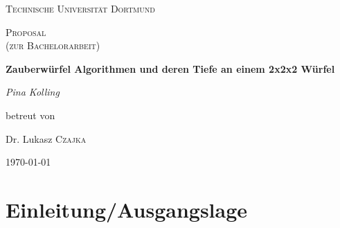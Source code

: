 \documentclass[12pt,a4paper, usenames, dvipsnames]{scrartcl}
\begin{document}
\begin{titlepage}
	\centering
	\vspace*{4cm}
	{\scshape\LARGE Technische Universität Dortmund \par}
	\vspace{1cm}
	{\scshape\Large Proposal \\
	(zur Bachelorarbeit) \par}
	\vspace{1.5cm}
	{\huge\bfseries Zauberwürfel Algorithmen und deren Tiefe an einem 2x2x2 Würfel\par}
	\vspace{2cm}
	{\Large\itshape Pina Kolling\par}
	\vfill
	betreut von\par
	Dr. Lukasz \textsc{Czajka}

	\vfill

	{\large \today\par}
\end{titlepage}


\tableofcontents

\thispagestyle{empty} 



\newpage

\setcounter{page}{1} 

\section{Einleitung/Ausgangslage}
\end{document}
